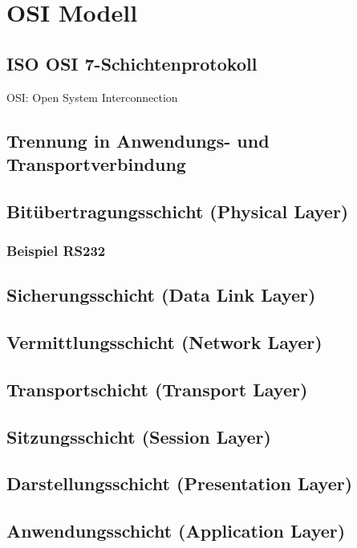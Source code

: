 \section{OSI Modell}
\subsection*{ISO OSI 7-Schichtenprotokoll}
OSI: Open System Interconnection
\subsection*{Trennung in Anwendungs- und Transportverbindung}
\subsection{Bitübertragungsschicht (Physical Layer)}
\subsubsection*{Beispiel RS232}
\subsection{Sicherungsschicht (Data Link Layer)}
\subsection{Vermittlungsschicht (Network Layer)}
\subsection{Transportschicht (Transport Layer)}
\subsection{Sitzungsschicht (Session Layer)}
\subsection{Darstellungsschicht (Presentation Layer)}
\subsection{Anwendungsschicht (Application Layer)}

